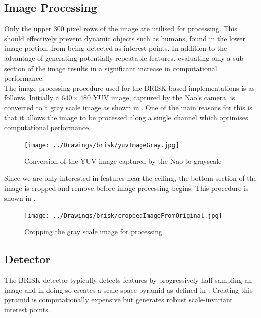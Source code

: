 \documentclass[11pt]{report}
\begin{document}
\subsection{Image Processing}
\label{sec:imageProcessingBrisk}
Only the upper $300$ pixel rows of the image are utilised for processing.  This should effectively prevent dynamic objects such as humans, found in the lower image portion, from being detected as interest points. In addition to the advantage of generating potentially repeatable features, evaluating only a sub-section of the image results in a significant increase in computational performance. \\ 

The image processing procedure used for the BRISK-based implementations is as follows. Initially a $640 \times 480$ YUV image, captured by the Nao's camera, is converted to a gray scale image as shown in . One of the main reasons for this is that it allows the image to be processed along a single channel which optimises computational performance. \\

\begin{figure}[h!] 
  \centering
    \texttt{[image: ../Drawings/brisk/yuvImageGray.jpg]}
    \caption{Conversion of the YUV image captured by the Nao to grayscale}
    \label{fig:colourGrayscale}
\end{figure}

Since we are only interested in features near the ceiling, the bottom section of the image is cropped and remove before image processing begins. This procedure is shown in .\\

\begin{figure}[h!] 
  \centering
    \texttt{[image: ../Drawings/brisk/croppedImageFromOriginal.jpg]}
    \caption{Cropping the gray scale image for processing}
    \label{fig:cropImage}
\end{figure}

\subsection{Detector}
\label{sec:BRISK0Detect}
The BRISK detector typically detects features by progressively half-sampling an image and in doing so creates a scale-space pyramid as defined in . Creating this pyramid is computationally expensive but generates robust scale-invariant interest points.\\
\end{document}
